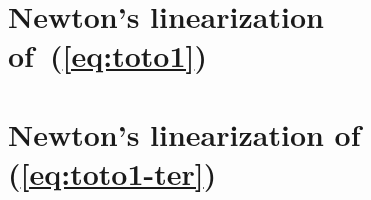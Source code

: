 \clearpage
\section{Newton's linearization of~(\ref{eq:toto1})} 







\section{Newton's linearization of~ (\ref{eq:toto1-ter}) }



